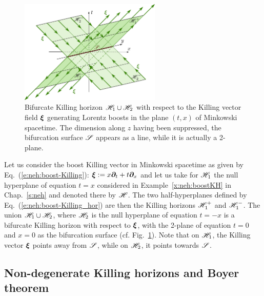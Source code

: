 \begin{figure}
\centerline{\includegraphics[width=0.6\textwidth]{sta_hplane_bifur.pdf}}
\caption[]{\label{f:sta:hplane_bifur} \footnotesize
Bifurcate Killing horizon $\mathscr{H}_1\cup\mathscr{H}_2$ with respect to the Killing vector
field $\bm{\xi}$ generating Lorentz boosts in the plane $(t,x)$ of Minkowski
spacetime. The dimension along $z$ having been suppressed, the bifurcation
surface $\mathscr{S}$ appears as a line, while it is actually a 2-plane.}
\end{figure}

\begin{example}
Let us consider the boost Killing vector in Minkowski spacetime as given
by Eq.~(\ref{e:neh:boost-Killing}): $\bm{\xi} := x \bm{\partial}_t + t \bm{\partial}_x$
and let us take for $\mathscr{H}_1$ the null hyperplane of equation $t=x$
considered in Example~\ref{x:neh:boostKH} in Chap.~\ref{s:neh} and denoted there
by $\mathscr{H}$. The two half-hyperplanes defined by
Eq.~(\ref{e:neh:boost-Killing_hor}) are then the Killing horizons $\mathscr{H}_1^+$ and
$\mathscr{H}_1^-$. The union $\mathscr{H}_1 \cup \mathscr{H}_2$, where $\mathscr{H}_2$ is the null hyperplane of equation $t=-x$ is a bifurcate Killing horizon with respect to $\bm{\xi}$,
with the 2-plane of equation $t=0$ and $x=0$ as the bifurcation surface
(cf. Fig.~\ref{f:sta:hplane_bifur}). Note that on $\mathscr{H}_1$, the Killing vector
$\bm{\xi}$ points away from $\mathscr{S}$, while on $\mathscr{H}_2$, it points towards $\mathscr{S}$.
\end{example}

\subsection{Non-degenerate Killing horizons and Boyer theorem}

